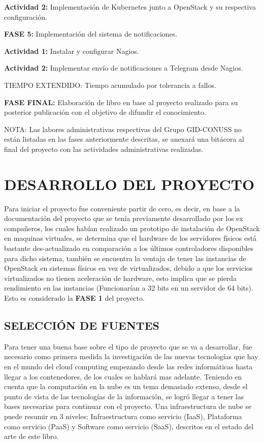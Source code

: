  \textbf{Actividad 2:} Implementación de Kubernetes junto a  OpenStack y su respectiva configuración. 
 
 \textbf{FASE 5:} Implementación del sistema de notificaciones. 
 
 \textbf{Actividad 1:} Instalar y configurar Nagios. 
 
 \textbf{Actividad 2:} Implementar envío de notificaciones a Telegram desde Nagios. 
 
 TIEMPO EXTENDIDO: Tiempo acumulado por tolerancia a fallos. 
 
 \textbf{FASE FINAL:} Elaboración de libro en base al proyecto realizado para su posterior publicación con el objetivo de difundir el conocimiento.  
 
 NOTA:  Las labores administrativas respectivas del Grupo GID-CONUSS no están listadas en las fases anteriormente descritas, se anexará una bitácora al final del proyecto con las actividades administrativas realizadas. 
 
 
    
    \newpage\chapter{DESARROLLO DEL PROYECTO} 
    
    Para iniciar el proyecto fue conveniente partir de cero, es decir, en base a la documentación del proyecto que se tenía previamente desarrollado por los ex compañeros, los cuales habían realizado un prototipo de instalación de OpenStack en maquinas virtuales, se determina que el hardware de los servidores físicos está bastante des-actualizado en comparación a los últimos controladores disponibles para dicho sistema, también se encuentra la ventaja de tener las instancias de OpenStack en sistemas físicos en vez de virtualizados, debido a que los servicios virtualizados no tienen aceleración de hardware, esto implica que se pierda rendimiento en las instancias (Funcionarían a 32 bits en un servidor de 64 bits). Esto es considerado la \textbf{FASE 1} del proyecto.
    
    \section{SELECCIÓN DE FUENTES} 
    Para tener una buena base sobre el tipo de proyecto que se va a desarrollar, fue necesario como primera medida la investigación de las nuevas tecnologías que hay en el mundo del cloud computing empezando desde las redes informáticas hasta llegar a los contenedores, de los cuales se hablará mas adelante. Teniendo en cuenta que la computación en la nube es un tema demasiado extenso, desde el punto de vista de las tecnologías de la información, se logró llegar a tener las bases necesarias para continuar con el proyecto. Una infraestructura de nube se puede resumir en 3 niveles: Infraestructura como servicio (IaaS), Plataforma como servicio (PaaS) y Software como servicio (SaaS), descritos en el estado del arte de este libro.
    

